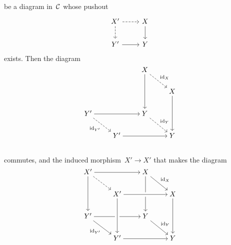 \begin{remark*}
\begin{enumerate}
\begin{itemize}
\[          \]
          be a diagram in~$\mathcal{C}$ whose pushout
          \[
            \begin{tikzcd}
                X'
                \arrow[dashed]{r}
                \arrow[dashed]{d}
              & X
                \arrow{d}
              \\
                Y'
                \arrow{r}
              & Y
            \end{tikzcd}
          \]
          exists.
          Then the diagram
          \[
            \begin{tikzcd}[cramped]
                {}
              & {}
              & X
                \arrow{dd}
                \arrow[dashed]{dr}[above right]{\id_X}
              & {}
              \\
                {}
              & {}
              & {}
              & X
                \arrow{dd}
              \\
                Y'
                \arrow{rr}
                \arrow[dashed]{dr}[below left]{\id_{Y'}}
              & {}
              & Y
                \arrow[dashed]{dr}[above right]{\id_Y}
              & {}
              \\
                {}
              & Y'
                \arrow{rr}
              & {}
              & Y
              \\
            \end{tikzcd}
          \]
          commutes, and the induced morphism~$X' \to X'$ that makes the diagram
          \[
            \begin{tikzcd}[cramped]
                X'
                \arrow{rr}
                \arrow[dashed]{dr}
                \arrow{dd}
              & {}
              & X
                \arrow{dd}
                \arrow{dr}[above right]{\id_X}
              & {}
              \\
                {}
              & X'
              & {}
              & X
                \arrow[from=ll, crossing over]
                \arrow{dd}
              \\
                Y'
                \arrow{rr}
                \arrow{dr}[below left]{\id_{Y'}}
              & {}
              & Y
                \arrow{dr}[above right]{\id_Y}
              & {}
              \\
                {}
              & Y'
                \arrow[from=uu, crossing over]
                \arrow{rr}
              & {}
              & Y
              \\

\end{tikzcd}\]
\end{itemize}
\end{enumerate}
\end{remark*}
